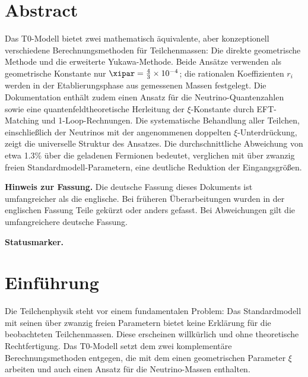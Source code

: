 
	\section*{Abstract}
	Das T0-Modell bietet zwei mathematisch äquivalente, aber konzeptionell verschiedene Berechnungsmethoden für Teilchenmassen: Die direkte geometrische Methode und die erweiterte Yukawa-Methode. Beide Ansätze verwenden als geometrische Konstante nur $\xipar = \frac{4}{3} \times 10^{-4}$; die rationalen Koeffizienten $r_i$ werden in der Etablierungsphase aus gemessenen Massen festgelegt. Die Dokumentation enthält zudem einen Ansatz für die Neutrino-Quantenzahlen sowie eine quantenfeldtheoretische Herleitung der $\xi$-Konstante durch EFT-Matching und 1-Loop-Rechnungen. Die systematische Behandlung aller Teilchen, einschließlich der Neutrinos mit der angenommenen doppelten $\xi$-Unterdrückung, zeigt die universelle Struktur des Ansatzes. Die durchschnittliche Abweichung von etwa 1.3\% über die geladenen Fermionen bedeutet, verglichen mit über zwanzig freien Standardmodell-Parametern, eine deutliche Reduktion der Eingangsgrößen.

	\medskip\noindent\textbf{Hinweis zur Fassung.} Die deutsche Fassung dieses Dokuments ist umfangreicher als die englische. Bei früheren Überarbeitungen wurden in der englischen Fassung Teile gekürzt oder anders gefasst. Bei Abweichungen gilt die umfangreichere deutsche Fassung.


	\medskip\noindent\textbf{Statusmarker.}
	
	

	
	\section{Einführung}
	\label{sec:introduction}
	
	Die Teilchenphysik steht vor einem fundamentalen Problem: Das Standardmodell mit seinen über zwanzig freien Parametern bietet keine Erklärung für die beobachteten Teilchenmassen. Diese erscheinen willkürlich und ohne theoretische Rechtfertigung. Das T0-Modell setzt dem zwei komplementäre Berechnungsmethoden entgegen, die mit dem einen geometrischen Parameter $\xi$ arbeiten und auch einen Ansatz für die Neutrino-Massen enthalten.
	
